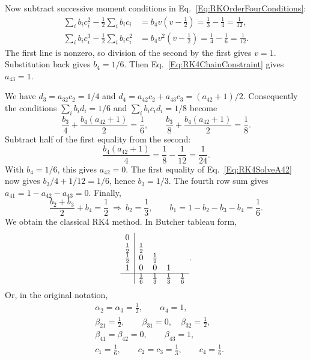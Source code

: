 Now subtract successive moment conditions in
Eq.~\ref{Eq:RKOrderFourConditions}:
\begin{equation}\label{Eq:RK4SolveV}
\begin{aligned}
 \sum_i b_ic_i^2-\frac12\sum_i b_ic_i
   &=b_4v(v-\tfrac12)=\frac13-\frac14=\frac1{12},\\
 \sum_i b_ic_i^3-\frac12\sum_i b_ic_i^2
   &=b_4v^2(v-\tfrac12)=\frac14-\frac16=\frac1{12}.
\end{aligned}
\end{equation}
The first line is nonzero, so division of the second by the first gives
$v=1$. Substitution back gives $b_4=1/6$. Then
Eq.~\ref{Eq:RK4ChainConstraint} gives $a_{43}=1$.

We have $d_3=a_{32}c_2=1/4$ and
$d_4=a_{42}c_2+a_{43}c_3=(a_{42}+1)/2$. Consequently the conditions
$\sum_i b_id_i=1/6$ and $\sum_i b_ic_id_i=1/8$ become
\begin{equation}\label{Eq:RK4SolveA42}
 \frac{b_3}{4}+\frac{b_4(a_{42}+1)}2=\frac16,
 \qquad
 \frac{b_3}{8}+\frac{b_4(a_{42}+1)}2=\frac18.
\end{equation}
Subtract half of the first equality from the second:
\[
 \frac{b_4(a_{42}+1)}4=\frac18-\frac1{12}=\frac1{24}.
\]
With $b_4=1/6$, this gives $a_{42}=0$. The first equality of
Eq.~\ref{Eq:RK4SolveA42} now gives $b_3/4+1/12=1/6$, hence $b_3=1/3$.
The fourth row sum gives $a_{41}=1-a_{42}-a_{43}=0$. Finally,
\[
 \frac{b_2+b_3}{2}+b_4=\frac12
 \ \Longrightarrow\ b_2=\frac13,
 \qquad b_1=1-b_2-b_3-b_4=\frac16.
\]
We obtain the classical RK4 method. In Butcher tableau form,
\begin{equation}\label{Eq:RK4Tableau}
\begin{array}{c|cccc}
 0&&&&\\
 \frac12&\frac12&&&\\
 \frac12&0&\frac12&&\\
 1&0&0&1&\\ \hline
 &\frac16&\frac13&\frac13&\frac16
\end{array}.
\end{equation}
Or, in the original notation,
\[
\begin{aligned}
 &\alpha_2=\alpha_3=\tfrac12,\qquad\alpha_4=1,\\
 &\beta_{21}=\tfrac12,\qquad\beta_{31}=0,\quad\beta_{32}=\tfrac12,\\
 &\beta_{41}=\beta_{42}=0,\qquad\beta_{43}=1,\\
 &c_1=\tfrac16,\qquad c_2=c_3=\tfrac13,\qquad c_4=\tfrac16.
\end{aligned}
\]
